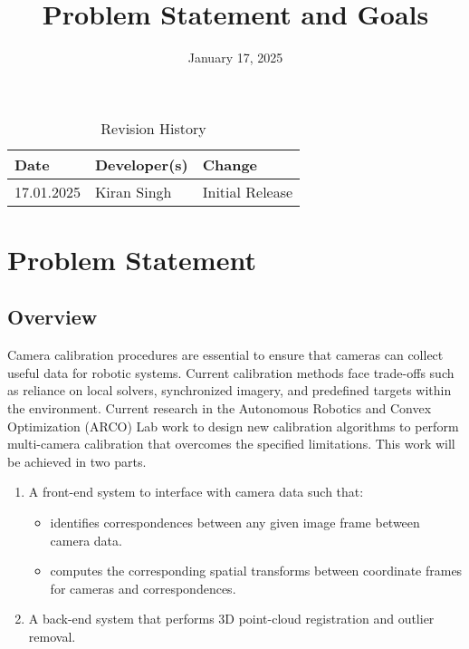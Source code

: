 \documentclass{article}
\title{Problem Statement and Goals\\\progname}
\author{\authname}
\date{January 17, 2025}
\begin{document}
\maketitle

\begin{table}[hp]
\caption{Revision History} \label{TblRevisionHistory}
\begin{tabularx}{\textwidth}{llX}
\toprule
\textbf{Date} & \textbf{Developer(s)} & \textbf{Change}\\
\midrule
17.01.2025 & Kiran Singh & Initial Release\\
\bottomrule
\end{tabularx}
\end{table}

\section{Problem Statement}
\subsection{Overview}
Camera calibration procedures are essential to ensure that cameras can collect 
useful data for robotic systems. Current calibration methods face trade-offs 
such as reliance on local solvers, synchronized imagery, and predefined targets 
within the environment. Current research in the Autonomous Robotics and Convex 
Optimization (ARCO) Lab work to design new calibration algorithms to perform 
multi-camera calibration that overcomes the specified limitations. This work 
will be achieved in two parts.

\begin{enumerate}
    \item A front-end system to interface with camera data such that:

    \begin{itemize}
        \item identifies correspondences between any given image frame between 
        camera data.

        \item computes the corresponding spatial transforms 
        between coordinate frames for cameras and correspondences.
    \end{itemize}

    \item A back-end system that performs 3D point-cloud registration and 
    outlier removal.
\end{enumerate}  
\end{document}
